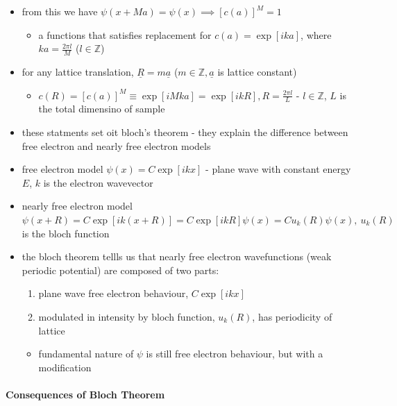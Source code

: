 \documentclass[a4paper,11pt,normalem]{article}
\begin{document}
\begin{itemize}
    \item from this we have \(\psi(x+Ma) = \psi(x) \implies [c(a)]^M = 1\)
        \begin{itemize}
            \item a functions that satisfies replacement for \(c(a) = \exp[ika]\), where \(ka = \frac{2\pi l}{M}\) (\(l \in \mathbb{Z}\))
        \end{itemize}
    \item for any lattice translation, \(\underline{R} = m\underline{a}\) (\(m \in \mathbb{Z},\underline{a}\) is lattice constant)
        \begin{itemize}
            \item \(c(R) = [c(a)]^M \equiv \exp[iMka] = \exp[ikR], R = \frac{2\pi l}{L}\) - \(l \in \mathbb{Z}\), \(L\) is the total dimensino of sample
        \end{itemize}
    \item these statments set oit bloch's theorem - they explain the difference between free electron and nearly free electron models
    \item free electron model \(\psi(x) = C\exp[ikx]\) - plane wave with constant energy \(E\), \(k\) is the electron wavevector
    \item nearly free electron model \(\psi(x+R) = C\exp[ik(x+R)] = C\exp[ikR]\psi(x) = Cu_k(R)\psi(x),~ u_k(R)\) is the bloch function
    \item the bloch theorem tellls us that nearly free electron wavefunctions (weak periodic potential) are composed of two parts:
        \begin{enumerate}
            \item plane wave free electron behaviour, \(C\exp[ikx]\)
            \item modulated in intensity by bloch function, \(u_k(R)\), has periodicity of lattice
        \end{enumerate}
        \begin{itemize}
            \item fundamental nature of \(\psi\) is still free electron behaviour, but with a modification
        \end{itemize}
\end{itemize}

\paragraph{Consequences of Bloch Theorem}
\end{document}
